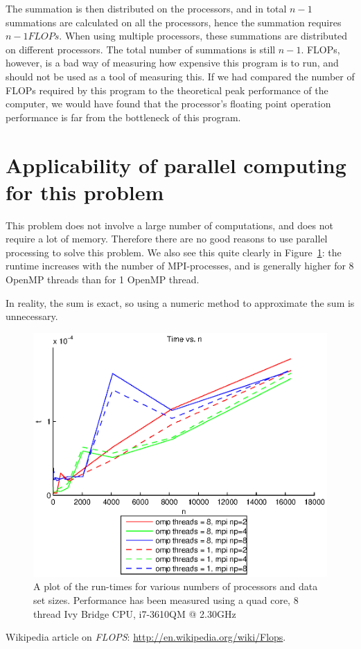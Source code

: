 The summation is then distributed on the processors, and in total $n-1$ summations are calculated on all the processors, hence the summation requires $n-1 FLOPs$. When using multiple processors, these summations are distributed on different processors. The total number of summations is still $n-1$.
FLOPs, however, is a bad way of measuring how expensive this program is to run, and should not be used as a tool of measuring this. If we had compared the number of FLOPs required by this program to the theoretical peak performance of the computer, we would have found that the processor's floating point operation performance is far from the bottleneck of this program.


\section{Applicability of parallel computing for this problem} %
\label{sec:applicability_of_parallel_computing_for_this_problem}
This problem does not involve a large number of computations, and does not require a lot of memory. Therefore there are no good reasons to use parallel processing to solve this problem. We also see this quite clearly in Figure~\ref{fig:runtime}: the runtime increases with the number of MPI-processes, and is generally higher for 8 OpenMP threads than for 1 OpenMP thread.

In reality, the sum is exact, so using a numeric method to approximate the sum is unnecessary.

\begin{figure}[H]
  \centering
  \includegraphics[]{graphics/runtime.eps}
  \caption{A plot of the run-times for various numbers of processors and data set sizes. Performance has been measured using a quad core, 8 thread Ivy Bridge CPU, i7-3610QM @ 2.30GHz}
  \label{fig:runtime}
\end{figure}

\begin{thebibliography}{1}
   Wikipedia article on \emph{FLOPS}: \url{http://en.wikipedia.org/wiki/Flops}.
\end{thebibliography}


